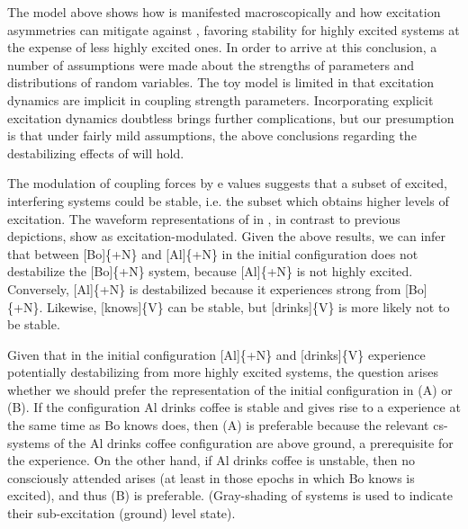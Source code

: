 The model above shows how   is manifested macroscopically and how excitation asymmetries can mitigate against , favoring stability for highly excited systems at the expense of less highly excited ones. In order to arrive at this conclusion, a number of assumptions were made about the strengths of parameters and distributions of random variables. The toy model is limited in that excitation dynamics are implicit in coupling strength parameters. Incorporating explicit excitation dynamics doubtless brings further complications, but our presumption is that under fairly mild assumptions, the above conclusions regarding the destabilizing effects of  will hold.

  The modulation of coupling forces by e values suggests that a subset of excited, interfering systems could be stable, i.e. the subset which obtains higher levels of excitation. The waveform representations of  in {}, in contrast to previous depictions, show  as excitation-modulated. Given the above results, we can infer that  between [Bo]\{+N\} and [Al]\{+N\} in the initial configuration does not destabilize the [Bo]\{+N\} system, because [Al]\{+N\} is not highly excited. Conversely, [Al]\{+N\} is destabilized because it experiences strong  from [Bo]\{+N\}. Likewise, [knows]\{V\} can be stable,  but [drinks]\{V\} is more likely not to be stable. 

  Given that in the initial configuration [Al]\{+N\} and [drinks]\{V\} experience potentially destabilizing  from more highly excited systems, the question arises whether we should prefer the representation of the initial configuration in {}(A) or (B). If the configuration {\textbar}Al drinks coffee{\textbar} is stable and gives rise to a  experience at the same time as {\textbar}Bo knows{\textbar} does, then (A) is preferable because the relevant cs-systems of the {\textbar}Al drinks coffee{\textbar} configuration are above ground, a prerequisite for the  experience. On the other hand, if {\textbar}Al drinks coffee{\textbar} is unstable, then no consciously attended  arises (at least in those epochs in which {\textbar}Bo knows{\textbar} is excited), and thus (B) is preferable. (Gray-shading of systems is used to indicate their sub-excitation (ground) level state).

